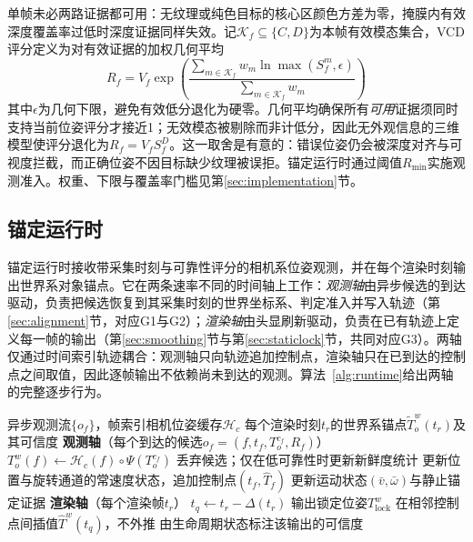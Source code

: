 \documentclass[review]{vgtc}
\begin{document}
单帧未必两路证据都可用：无纹理或纯色目标的核心区颜色方差为零，掩膜内有效深度覆盖率过低时深度证据同样失效。记$\mathcal{K}_f \subseteq \{C, D\}$为本帧有效模态集合，VCD评分定义为对有效证据的加权几何平均
\begin{equation}
R_f = V_f \exp\!\left(\frac{\sum_{m \in \mathcal{K}_f} w_m \ln \max(S_f^{m}, \epsilon)}{\sum_{m \in \mathcal{K}_f} w_m}\right)
\label{eq:vcd}
\end{equation}
其中$\epsilon$为几何下限，避免有效低分退化为硬零。几何平均确保所有\emph{可用}证据须同时支持当前位姿评分才接近1；无效模态被剔除而非计低分，因此无外观信息的三维模型使评分退化为$R_f = V_f S_f^D$。这一取舍是有意的：错误位姿仍会被深度对齐与可视度拦截，而正确位姿不因目标缺少纹理被误拒。锚定运行时通过阈值$R_{\min}$实施观测准入。权重、下限与覆盖率门槛见第\ref{sec:implementation}节。

\subsection{锚定运行时}\label{sec:anchoring}

锚定运行时接收带采集时刻与可靠性评分的相机系位姿观测，并在每个渲染时刻输出世界系对象锚点。它在两条速率不同的时间轴上工作：\emph{观测轴}由异步候选的到达驱动，负责把候选恢复到其采集时刻的世界坐标系、判定准入并写入轨迹（第\ref{sec:alignment}节，对应G1与G2）；\emph{渲染轴}由头显刷新驱动，负责在已有轨迹上定义每一帧的输出（第\ref{sec:smoothing}节与第\ref{sec:staticlock}节，共同对应G3）。两轴仅通过时间索引轨迹耦合：观测轴只向轨迹追加控制点，渲染轴只在已到达的控制点之间取值，因此逐帧输出不依赖尚未到达的观测。算法~\ref{alg:runtime}给出两轴的完整逐步行为。

\begin{algorithm}[t]
\caption{锚定运行时的两条时间轴}
\label{alg:runtime}
\small
\begin{algorithmic}[1]
\Require 异步观测流$\{o_f\}$，帧索引相机位姿缓存$\mathcal{H}_c$
\Ensure 每个渲染时刻$t_r$的世界系锚点$\widetilde{T}_o^w(t_r)$及其可信度
\Statex \textbf{观测轴}（每个到达的候选$o_f = (f, t_f, T_o^{c_f}, R_f)$）
\State $T_o^w(f) \gets \mathcal{H}_c(f) \circ \Psi(T_o^{c_f})$ 
 
  \State 丢弃候选；仅在低可靠性时更新新鲜度统计
\Else
  \State 更新位置与旋转通道的常速度状态，追加控制点$(t_f, \widehat{T}_f)$
  \State 更新运动状态$(\bar{v}, \bar{\omega})$与静止锚定证据 
\EndIf
\Statex \textbf{渲染轴}（每个渲染帧$t_r$）
\State $t_q \gets t_r - \Delta(t_r)$ 
  \State 输出锁定位姿$T_{\mathrm{lock}}^w$ 
\Else
  \State 在相邻控制点间插值$\widehat{T}^w(t_q)$，不外推 
\EndIf
\State 由生命周期状态标注该输出的可信度
\end{algorithmic}
\end{algorithm}
\end{document}
